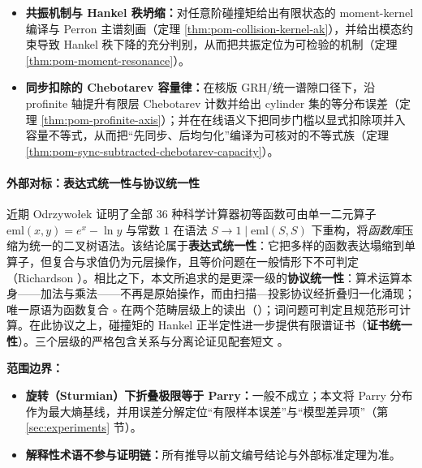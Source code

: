 \begin{itemize}
  \item \textbf{共振机制与 Hankel 秩坍缩：}对任意阶碰撞矩给出有限状态的 moment-kernel 编译与 Perron 主谱刻画（定理 \ref{thm:pom-collision-kernel-ak}），并给出模态约束导致 Hankel 秩下降的充分判别，从而把共振定位为可检验的机制（定理 \ref{thm:pom-moment-resonance}）。
  \item \textbf{同步扣除的 Chebotarev 容量律：}在核版 GRH/统一谱隙口径下，沿 profinite 轴提升有限层 Chebotarev 计数并给出 cylinder 集的等分布误差（定理 \ref{thm:pom-profinite-axis}）；并在在线语义下把同步门槛以显式扣除项并入容量不等式，从而把“先同步、后均匀化”编译为可核对的不等式族（定理 \ref{thm:pom-sync-subtracted-chebotarev-capacity}）。
\end{itemize}


\paragraph{外部对标：表达式统一性与协议统一性}
近期 Odrzywołek \cite{Odrzywolek2026SingleBinaryOperator} 证明了全部 36 种科学计算器初等函数可由单一二元算子 $\mathrm{eml}(x,y)=e^x-\ln y$ 与常数 $1$ 在语法 $S\to 1\mid\mathrm{eml}(S,S)$ 下重构，将\emph{函数库}压缩为统一的二叉树语法。该结论属于\textbf{表达式统一性}：它把多样的函数表达塌缩到单算子，但复合与求值仍为元层操作，且等价问题在一般情形下不可判定（Richardson \cite{Richardson1968}）。相比之下，本文所追求的是更深一级的\textbf{协议统一性}：算术运算本身——加法与乘法——不再是原始操作，而由扫描—投影协议经折叠归一化涌现；唯一原语为函数复合 $\circ$ 在两个范畴层级上的读出（\cite{OmegaHierarchy2026}）；词问题可判定且规范形可计算。在此协议之上，碰撞矩的 Hankel 正半定性进一步提供有限谱证书（\textbf{证书统一性}）。三个层级的严格包含关系与分离论证见配套短文 \cite{OmegaHierarchy2026}。

\textbf{范围边界：}
\begin{itemize}
  \item \textbf{旋转（Sturmian）下折叠极限等于 Parry：}一般不成立；本文将 Parry 分布作为最大熵基线，并用误差分解定位“有限样本误差”与“模型差异项”（第 \ref{sec:experiments} 节）。
  \item \textbf{解释性术语不参与证明链：}所有推导以前文编号结论与外部标准定理为准。
\end{itemize}


